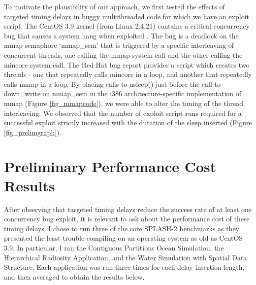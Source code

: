 \documentclass[12pt,conference]{IEEEtran}
\begin{document}
To motivate the plausibility of our approach, we first tested the effects of targeted timing delays in buggy multithreaded code for which we have an exploit script.  The CentOS 3.9 kernel (from Linux 2.4.21) contains a critical concurrency bug that causes a system hang when exploited \cite{CVE2006-4814}.  The bug is a deadlock on the mmap semaphore `mmap\_sem' that is triggered by a specific interleaving of concurrent threads, one calling the mmap system call and the other calling the mincore system call.  The Red Hat bug report \cite{RHELbug180663} provides a script which creates two threads - one that repeatedly calls mincore in a loop, and another that repeatedly calls mmap in a loop.  By placing calls to usleep() just before the call to down\_write on mmap\_sem in the i386 architecture-specific implementation of mmap (Figure \ref{fig_mmapcode}), we were able to alter the timing of the thread interleaving.  We observed that the number of exploit script runs required for a successful exploit strictly increased with the duration of the sleep inserted (Figure \ref{fig_prelimgraph}).

\section{Preliminary Performance Cost Results}
After observing that targeted timing delays reduce the success rate of at least one concurrency bug exploit, it is relevant to ask about the performance cost of these timing delays.  I chose to run three of the core SPLASH-2 benchmarks \cite{Woo1995} as they presented the least trouble compiling on an operating system as old as CentOS 3.9.  In particular, I ran the Contiguous Partitions Ocean Simulation, the Hierarchical Radiosity Application, and the Water Simulation with Spatial Data Structure.  Each application was run three times for each delay insertion length, and then averaged to obtain the results below.
\end{document}
